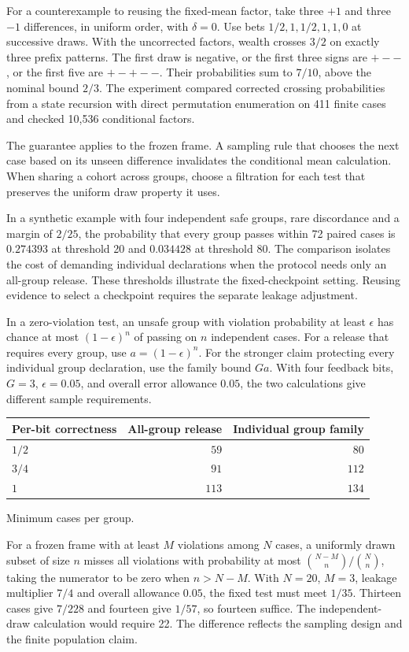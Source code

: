 \documentclass[11pt]{article}
\begin{document}
For a counterexample to reusing the fixed-mean factor, take three
$+1$ and three $-1$ differences, in uniform order, with $\delta=0$.
Use bets $1/2,1,1/2,1,1,0$ at successive draws. With the uncorrected
factors, wealth crosses $3/2$ on exactly three prefix patterns.
The first draw is negative, or the first three signs are $+--$,
or the first five are $+-+--$. Their probabilities sum to $7/10$,
above the nominal bound $2/3$. The experiment compared corrected
crossing probabilities from a state recursion with direct permutation
enumeration on 411 finite cases and checked 10,536 conditional factors.

The guarantee applies to the frozen frame. A sampling rule that
chooses the next case based on its unseen difference invalidates the
conditional mean calculation. When sharing a cohort across groups,
choose a filtration for each test that preserves the uniform draw
property it uses.

In a synthetic example with four independent safe groups, rare
discordance and a margin of $2/25$, the probability that every
group passes within 72 paired cases is $0.274393$ at threshold
20 and $0.034428$ at threshold 80. The comparison isolates the
cost of demanding individual declarations when the protocol needs
only an all-group release. These thresholds illustrate the
fixed-checkpoint setting. Reusing evidence to select a checkpoint
requires the separate leakage adjustment.

In a zero-violation test, an unsafe group with violation probability
at least $\epsilon$ has chance at most $(1-\epsilon)^n$ of passing
on $n$ independent cases. For a release that requires every group,
use $a=(1-\epsilon)^n$. For the stronger claim protecting
every individual group declaration, use the family bound
$Ga$. With four feedback bits, $G=3$, $\epsilon=0.05$, and
overall error allowance $0.05$, the two calculations give
different sample requirements.
\begin{center}
\begin{tabular}{lrr}
\toprule
Per-bit correctness & All-group release & Individual group family \\
\midrule
$1/2$ & $59$ & $80$ \\
$3/4$ & $91$ & $112$ \\
$1$ & $113$ & $134$ \\
\bottomrule
\end{tabular}

\smallskip
\footnotesize Minimum cases per group.
\end{center}
For a frozen frame with at least $M$ violations among $N$ cases,
a uniformly drawn subset of size $n$ misses all violations with
probability at most $\binom{N-M}{n}/\binom{N}{n}$, taking the
numerator to be zero when $n>N-M$. With $N=20$, $M=3$, leakage
multiplier $7/4$ and overall allowance $0.05$, the fixed test must
meet $1/35$. Thirteen cases give $7/228$ and fourteen give $1/57$,
so fourteen suffice. The independent-draw calculation would require
22. The difference reflects the sampling design and the finite
population claim.
\end{document}
